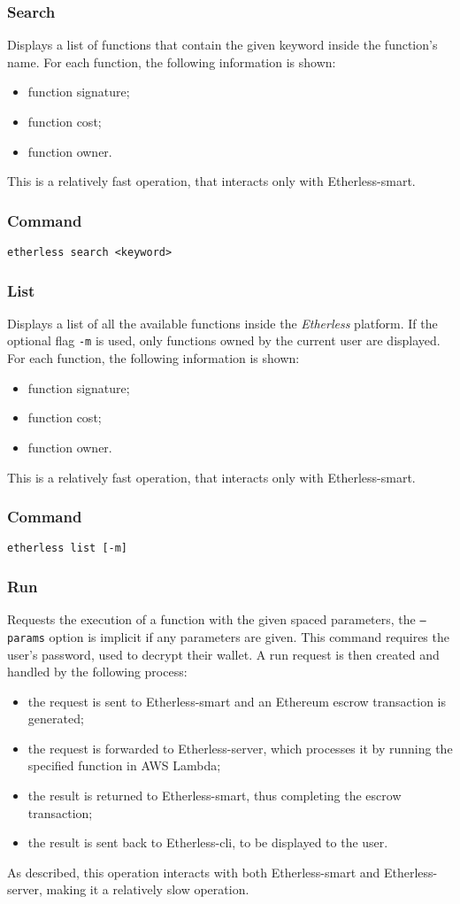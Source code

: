 	\subsubsection{Search}
	Displays a list of functions that contain the given keyword inside the function's name. For each function, the following information is shown:
	\begin{itemize}
		\item function signature;
		\item function cost;
		\item function owner.
	\end{itemize}
	This is a relatively fast operation, that interacts only with Etherless-smart.
	\subsubsection*{Command}
	\texttt{etherless search <keyword>}
	\subsubsection{List}
	Displays a list of all the available functions inside the \textit{Etherless} platform. If the optional flag \texttt{-m} is used, only functions owned by the current user are displayed. For each function, the following information is shown:
	\begin{itemize}
		\item function signature;
		\item function cost;
		\item function owner.
	\end{itemize}This is a relatively fast operation, that interacts only with Etherless-smart.
	\subsubsection*{Command}
	\texttt{etherless list [-m]}
	\subsubsection{Run}
	Requests the execution of a function with the given spaced parameters, the \texttt{---params} option is implicit if any parameters are given. This command requires the user's password, used to decrypt their wallet. A run request is then created and handled by the following process:
	\begin{itemize}
		\item the request is sent to Etherless-smart and an Ethereum escrow transaction is generated;
		\item the request is forwarded to Etherless-server, which processes it by running the specified function in AWS Lambda;
		\item the result is returned to Etherless-smart, thus completing the escrow transaction;
		\item the result is sent back to Etherless-cli, to be displayed to the user.
	\end{itemize}
	As described, this operation interacts with both Etherless-smart and Etherless-server, making it a relatively slow operation.

